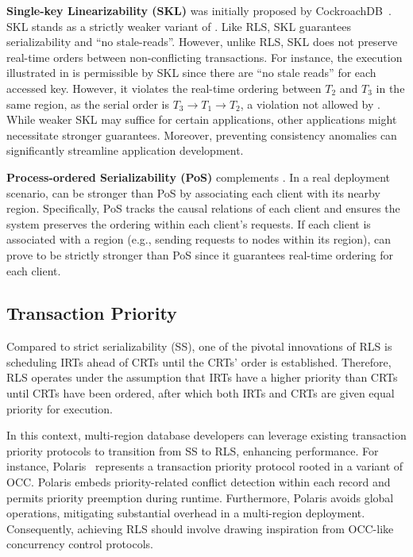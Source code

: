 \noindent\textbf{Single-key Linearizability (SKL)} was initially proposed by CockroachDB~\cite{taft2020cockroachdb}. SKL stands as a strictly weaker variant of \xxcons. Like RLS, SKL guarantees serializability and ``no stale-reads''. However, unlike RLS, SKL does not preserve real-time orders between non-conflicting transactions. For instance, the execution illustrated in  is permissible by SKL since there are ``no stale reads'' for each accessed key. However, it violates the real-time ordering between $T_2$ and $T_3$ in the same region, as the serial order is $T_3 \rightarrow T_1 \rightarrow T_2$, a violation not allowed by \xxcons. While weaker SKL may suffice for certain applications, other applications might necessitate stronger guarantees. Moreover, preventing consistency anomalies can significantly streamline application development.


\noindent\textbf{Process-ordered Serializability (PoS)} complements \xxcons. In a real deployment scenario, \xxcons can be stronger than PoS by associating each client with its nearby region. Specifically, PoS tracks the causal relations of each client and ensures the system preserves the ordering within each client's requests. If each client is associated with a region (e.g., sending requests to nodes within its region), \xxcons can prove to be strictly stronger than PoS since it guarantees real-time ordering for each client. 


\subsection{Transaction Priority}\label{sec:related:priority}

Compared to strict serializability (SS), one of the pivotal innovations of RLS is scheduling IRTs ahead of CRTs until the CRTs' order is established. Therefore, RLS operates under the assumption that IRTs have a higher priority than CRTs until CRTs have been ordered, after which both IRTs and CRTs are given equal priority for execution.

In this context, multi-region database developers can leverage existing transaction priority protocols to transition from SS to RLS, enhancing performance. For instance, Polaris~\cite{ye2023polaris} represents a transaction priority protocol rooted in a variant of OCC. Polaris embeds priority-related conflict detection within each record and permits priority preemption during runtime. 
Furthermore, Polaris avoids global operations, mitigating substantial overhead in a multi-region deployment. Consequently, achieving RLS should involve drawing inspiration from OCC-like concurrency control protocols. 


